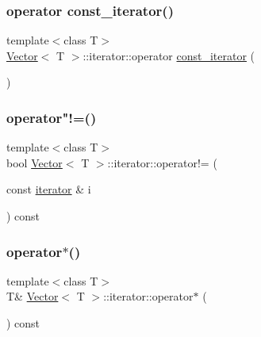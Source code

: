 \subsubsection{\texorpdfstring{operator const\+\_\+iterator()}{operator const\_iterator()}}
{\footnotesize\ttfamily template$<$class T$>$ \\
\hyperlink{classVector}{Vector}$<$ T $>$\+::iterator\+::operator \hyperlink{classVector_1_1const__iterator}{const\+\_\+iterator} (\begin{DoxyParamCaption}{ }\end{DoxyParamCaption})\hspace{0.3cm}{\ttfamily [inline]}}

\mbox{\label{classVector_1_1iterator_a755741485c5a92ed32484b350abfd041_a755741485c5a92ed32484b350abfd041}} 
\subsubsection{\texorpdfstring{operator"!=()}{operator!=()}}
{\footnotesize\ttfamily template$<$class T$>$ \\
bool \hyperlink{classVector}{Vector}$<$ T $>$\+::iterator\+::operator!= (\begin{DoxyParamCaption}\item[{const \hyperlink{classVector_1_1iterator}{iterator} \&}]{i }\end{DoxyParamCaption}) const\hspace{0.3cm}{\ttfamily [inline]}}

\mbox{\label{classVector_1_1iterator_a55aa58a9c5917f66b6c2d57617e67036_a55aa58a9c5917f66b6c2d57617e67036}} 
\subsubsection{\texorpdfstring{operator$\ast$()}{operator*()}}
{\footnotesize\ttfamily template$<$class T$>$ \\
T\& \hyperlink{classVector}{Vector}$<$ T $>$\+::iterator\+::operator$\ast$ (\begin{DoxyParamCaption}{ }\end{DoxyParamCaption}) const\hspace{0.3cm}{\ttfamily [inline]}}

